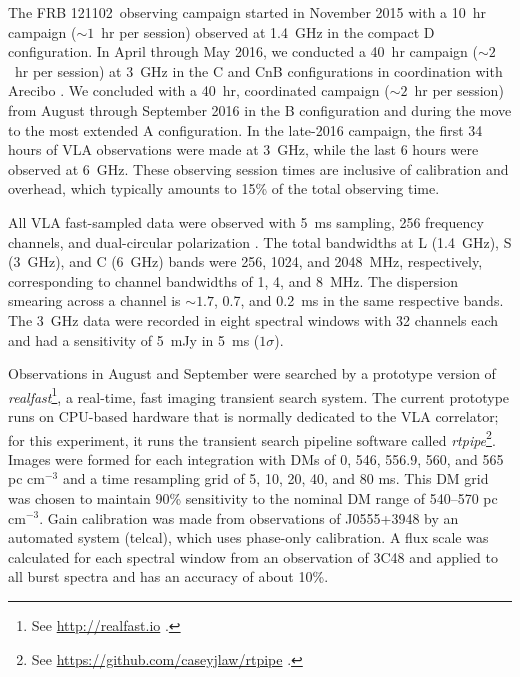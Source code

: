 \documentclass[twocolumn]{aastex61}
\newcommand{\frb}{FRB 121102}
\begin{document}
The \frb\ observing campaign started in November 2015 with a 10~hr campaign ($\sim1$~hr per session) observed at 1.4~GHz in the compact D configuration. In April through May 2016, we conducted a 40~hr campaign ($\sim2$~hr per session) at 3~GHz in the C and CnB configurations in coordination with Arecibo \citep{2016arXiv160308880S}. We concluded with a 40~hr, coordinated campaign ($\sim2$~hr per session) from August through September 2016 in the B configuration and during the move to the most extended A configuration. In the late-2016 campaign, the first 34 hours of VLA observations were made at 3~GHz, while the last 6 hours were observed at 6~GHz. These observing session times are inclusive of calibration and overhead, which typically amounts to 15\% of the total observing time.

All VLA fast-sampled data were observed with 5~ms sampling, 256 frequency channels, and dual-circular polarization \citep{2015ApJ...807...16L}. The total bandwidths at L (1.4~GHz), S (3~GHz), and C (6~GHz) bands were 256, 1024, and 2048~MHz, respectively, corresponding to channel bandwidths of  1, 4, and 8~MHz. The dispersion smearing across a channel is $\sim1.7$, 0.7, and 0.2~ms in the same respective bands. The 3~GHz data were recorded in eight spectral windows with 32 channels each and had a sensitivity of 5~mJy in 5~ms ($1\sigma$).

Observations in August and September were searched by a prototype version of \textit{realfast}\footnote{See \url{http://realfast.io} \citep{2017AAS...22933002L}.}, a real-time, fast imaging transient search system. The current prototype runs on CPU-based hardware that is normally dedicated to the VLA correlator; for this experiment, it runs the transient search pipeline software called \emph{rtpipe}\footnote{See \url{https://github.com/caseyjlaw/rtpipe} \citep{2015ApJ...807...16L}.}. Images were formed for each integration with DMs of 0, 546, 556.9, 560, and 565 pc cm$^{-3}$ and a time resampling grid of 5, 10, 20, 40, and 80 ms. This DM grid was chosen to maintain 90\% sensitivity to the nominal DM range of 540--570 pc cm$^{-3}$. Gain calibration was made from observations of J0555+3948 by an automated system (telcal), which uses phase-only calibration. A flux scale was calculated for each spectral window from an observation of 3C48 and applied to all burst spectra and has an accuracy of about 10\%.
\end{document}
